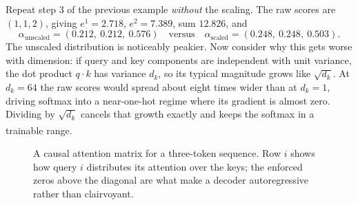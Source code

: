 \begin{workedexample}
Repeat step 3 of the previous example \emph{without} the scaling. The raw scores
are $(1,1,2)$, giving $e^1=2.718$, $e^2=7.389$, sum $12.826$, and
\[
  \alpha_{\text{unscaled}} = (0.212,\ 0.212,\ 0.576)
  \quad\text{versus}\quad
  \alpha_{\text{scaled}} = (0.248,\ 0.248,\ 0.503).
\]
The unscaled distribution is noticeably peakier. Now consider why this gets
worse with dimension: if query and key components are independent with unit
variance, the dot product $q\!\cdot\!k$ has variance $d_k$, so its typical
magnitude grows like $\sqrt{d_k}$. At $d_k = 64$ the raw scores would spread
about eight times wider than at $d_k = 1$, driving softmax into a near-one-hot
regime where its gradient is almost zero. Dividing by $\sqrt{d_k}$ cancels that
growth exactly and keeps the softmax in a trainable
range\textsuperscript{\cite[][p.~4]{vaswaniAttentionAllYou2023}}.
\end{workedexample}

\begin{figure}[htbp]
\centering
{}
\caption{A causal attention matrix for a three-token sequence. Row $i$ shows how
query $i$ distributes its attention over the keys; the enforced zeros above the
diagonal are what make a decoder autoregressive rather than clairvoyant.}
\label{fig:dl-attention-matrix}
\end{figure}

